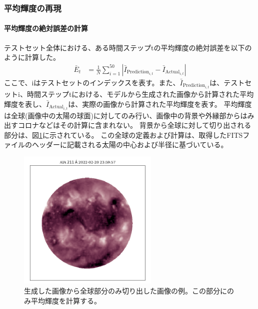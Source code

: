       \subsubsection{平均輝度の再現}
        \paragraph{平均輝度の絶対誤差の計算}
          テストセット全体における、ある時間ステップtの平均輝度の絶対誤差を以下のように計算した。
          \begin{align}
            \bar{E}_{t} & = \frac{1}{N} \sum_{i=1}^{50} | \bar{I}_{\text{Prediction}_{i,t}} - \bar{I}_{\text{Actual}_{i,t}} |
          \end{align}
          ここで、iはテストセットのインデックスを表す。また、\( \bar{I}_{\text{Prediction}_{i,t}} \)は、テストセットi、時間ステップtにおける、モデルから生成された画像から計算された平均輝度を表し、\( \bar{I}_{\text{Actual}_{i,t}} \)は、実際の画像から計算された平均輝度を表す。
          平均輝度は全球(画像中の太陽の球面)に対してのみ行い、画像中の背景や外縁部からはみ出すコロナなどはその計算に含まれない。
          背景から全球に対して切り出される部分は、図\ref{fig:exp1_fulldisk_crop}に示されている。
          この全球の定義および計算は、取得したFITSファイルのヘッダーに記載される太陽の中心および半径に基づいている。
          \begin{figure}[htbp]
            \centering
            \includegraphics[width=0.6\textwidth]{figures/exp1/crop_map.png}
            \caption{生成した画像から全球部分のみ切り出した画像の例。この部分にのみ平均輝度を計算する。}
            \label{fig:exp1_fulldisk_crop}
          \end{figure}

